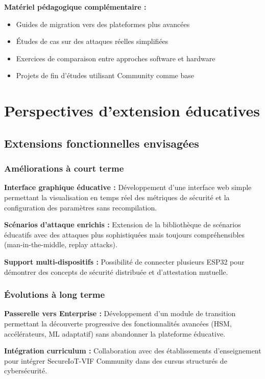 \begin{itemize}
\begin{table}[h]
\begin{table}[h]
\begin{table}[h]
\begin{itemize}
\begin{table}[h]
\begin{table}[h]
\textbf{Matériel pédagogique complémentaire :}
\begin{itemize}
    \item Guides de migration vers des plateformes plus avancées
    \item Études de cas sur des attaques réelles simplifiées
    \item Exercices de comparaison entre approches software et hardware
    \item Projets de fin d'études utilisant Community comme base
\end{itemize}

\section{Perspectives d'extension éducatives}

\subsection{Extensions fonctionnelles envisagées}

\subsubsection{Améliorations à court terme}

\textbf{Interface graphique éducative :} Développement d'une interface web simple permettant la visualisation en temps réel des métriques de sécurité et la configuration des paramètres sans recompilation.

\textbf{Scénarios d'attaque enrichis :} Extension de la bibliothèque de scénarios éducatifs avec des attaques plus sophistiquées mais toujours compréhensibles (man-in-the-middle, replay attacks).

\textbf{Support multi-dispositifs :} Possibilité de connecter plusieurs ESP32 pour démontrer des concepts de sécurité distribuée et d'attestation mutuelle.

\subsubsection{Évolutions à long terme}

\textbf{Passerelle vers Enterprise :} Développement d'un module de transition permettant la découverte progressive des fonctionnalités avancées (HSM, accélérateurs, ML adaptatif) sans abandonner la plateforme éducative.

\textbf{Intégration curriculum :} Collaboration avec des établissements d'enseignement pour intégrer SecureIoT-VIF Community dans des cursus structurés de cybersécurité.


\end{table}
\end{table}
\end{itemize}
\end{table}
\end{table}
\end{table}
\end{itemize}
